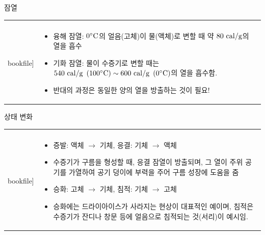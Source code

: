 \begin{frame}[t]{잠열}
	\begin{tabular}{ll}
		\begin{minipage}[t]{0.65\textwidth}
			\begin{figure}[t]
				\texttt{[image: \\bookfile]}
			\end{figure}
		\end{minipage}	
		&
		\begin{minipage}[t]{0.3\textwidth} \scriptsize
			\begin{itemize}
				\item 융해 잠열: $0 \rm{{^\circ}C}$의 얼음(고체)이 물(액체)로 변할 때 약 
				$80 \rm{~cal/g}$의 열을 흡수
				\item 기화 잠열: 물이 수증기로 변할 때는 $540 \rm{~cal/g} ~\left(100 \rm{{^\circ}C}\right) \sim600 \rm{~cal/g}~\left(0 \rm{{^\circ}C}\right)$의 열을 흡수함.
				\item 반대의 과정은 동일한 양의 열을 방출하는 것이 필요!
			\end{itemize}
			
		\end{minipage}
	\end{tabular}
\end{frame}





\begin{frame}[t]{상태 변화}
	\begin{tabular}{ll}
		\begin{minipage}[t]{0.60\textwidth}
			\begin{figure}[t]
				\texttt{[image: \\bookfile]}
			\end{figure}
		\end{minipage}	
		&
		\begin{minipage}[t]{0.35\textwidth} \scriptsize
			\begin{itemize}
				\item 증발: 액체 $\rightarrow$ 기체, 응결: 기체 $\rightarrow$ 액체
				\item 수증기가 구름을 형성할 때, 응결 잠열이 방출되며, 그 열이 주위 공기를 가열하여 공기 덩이에 부력을 주어 구름 성장에 도움을 줌
				\item 승화: 고체 $\rightarrow$ 기체, 침적: 기체 $\rightarrow$ 고체
				\item 승화에는 드라이아이스가 사라지는 현상이 대표적인 예이며, 침적은 수증기가 잔디나 창문 등에 얼음으로 침적되는 것(서리)이 예시임.
			\end{itemize}

		\end{minipage}
	\end{tabular}
\end{frame}





